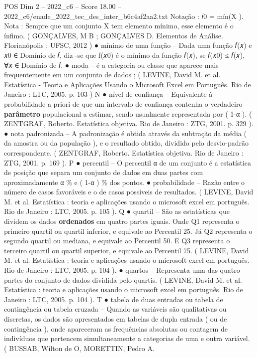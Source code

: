 \begin{textsample}{POS Dim 2 – 2022\_c6 – Score 18.00 – 2022\_c6/enade\_2022\_tec\_des\_inter\_b6c4af2aa2.txt}
Notação : 𝑖0 = mín(X ).
Nota : Sempre que um conjunto X tem elemento mínimo, esse elemento é o ínfimo. ( GONÇALVES, M B ; GONÇALVES D.
Elementos de Análise.
Florianópolis : UFSC, 2012 ) {\EmojiFont ●} mínimo de uma função – Dada uma função 𝑓(𝑥) e 𝑥0 ∈ Domínio de 𝑓, diz -se que f(𝑥0) é o mínimo da função 𝑓(𝑥), se 𝑓(𝑥0) ≤ 𝑓(𝑥), ∀𝑥 ∈ Domínio de 𝑓. {\EmojiFont ●} moda – é a categoria ou classe que aparece mais frequentemente em um conjunto de dados ; ( LEVINE, David M. et al.
Estatística - Teoria e Aplicações Usando o Microsoft Excel em Português.
Rio de Janeiro : LTC, 2005. p. 103 ) N {\EmojiFont ●} nível de confiança – Equivalente à probabilidade a priori de que um intervalo de confiança contenha o verdadeiro \textbf{parâmetro} populacional a estimar, sendo usualmente representada por ( 1-α ). ( ZENTGRAF, Roberto.
Estatística objetiva.
Rio de Janeiro : ZTG, 2001. p. 329 ). {\EmojiFont ●} nota padronizada – A padronização é obtida através da subtração da média ( da amostra ou da população ), e o resultado obtido, dividido pelo desvio-padrão correspondente. ( ZENTGRAF, Roberto.
Estatística objetiva.
Rio de Janeiro : ZTG, 2001. p. 169 ).
P {\EmojiFont ●} percentil – O percentil α de um conjunto é a estatística de posição que separa um conjunto de dados em duas partes com aproximadamente α \% e ( 1-α ) \% dos pontos. {\EmojiFont ●} probabilidade – Razão entre o número de casos favoráveis e o de casos possíveis de resultados. ( LEVINE, David M. et al.
Estatística : teoria e aplicações usando o microsoft excel em português.
Rio de Janeiro : LTC, 2005. p. 105 ).
Q {\EmojiFont ●} quartil – São as estatísticas que dividem os dados \textbf{ordenados} em quatro partes iguais.
Onde Q1 representa o primeiro quartil ou quartil inferior, e equivale ao Percentil 25.
Já Q2 representa o segundo quartil ou mediana, e equivale ao Percentil 50.
E Q3 representa o terceiro quartil ou quartil superior, e equivale ao Percentil 75. ( LEVINE, David M. et al.
Estatística : teoria e aplicações usando o microsoft excel em português.
Rio de Janeiro : LTC, 2005. p. 104 ). {\EmojiFont ●} quartos – Representa uma das quatro partes do conjunto de dados dividida pelo quartis. ( LEVINE, David M. et al.
Estatística : teoria e aplicações usando o microsoft excel em português.
Rio de Janeiro : LTC, 2005. p. 104 ).
T {\EmojiFont ●} tabela de duas entradas ou tabela de contingência ou tabela cruzada – Quando as variáveis são qualitativas ou discretas, os dados são apresentados em tabelas de dupla entrada ( ou de contingência ), onde apareceram as frequências absolutas ou contagem de indivíduos que pertencem simultaneamente a categorias de uma e outra variável. ( BUSSAB, Wilton de O, MORETTIN, Pedro A.

\end{textsample}
